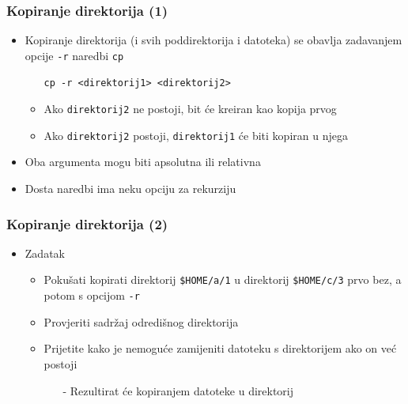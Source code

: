 \documentclass{beamer}
\begin{document}
\begin{frame}[t]
\frametitle{Kopiranje direktorija (1)}
\begin{itemize}
  \item Kopiranje direktorija (i svih poddirektorija i datoteka) se 
        obavlja zadavanjem opcije \texttt{-r} naredbi \texttt{cp}
  \begin{itemize}
    \item[] \texttt{cp -r \textless direktorij1\textgreater
                          \textless direktorij2\textgreater}
    \item Ako \texttt{direktorij2} ne postoji, bit će kreiran kao kopija
          prvog
    \item Ako \texttt{direktorij2} postoji, \texttt{direktorij1} će biti
          kopiran u njega 
  \end{itemize}
  \item Oba argumenta mogu biti apsolutna ili relativna
  \item Dosta naredbi ima neku opciju za rekurziju
\end{itemize}
\end{frame}

\begin{frame}[t]
\frametitle{Kopiranje direktorija (2)}
\begin{itemize}
  \item Zadatak
  \begin{itemize}
    \item Pokušati kopirati direktorij \texttt{\$HOME/a/1} u direktorij 
          \texttt{\$HOME/c/3} prvo bez, a potom s opcijom \texttt{-r}
    \item Provjeriti sadržaj odredišnog direktorija
    \item Prijetite kako je nemoguće zamijeniti datoteku s direktorijem
          ako on već postoji
    \begin{itemize}
      \item[-] Rezultirat će kopiranjem datoteke u direktorij
    \end{itemize}
  \end{itemize}
\end{itemize}
\end{frame}
\end{document}
